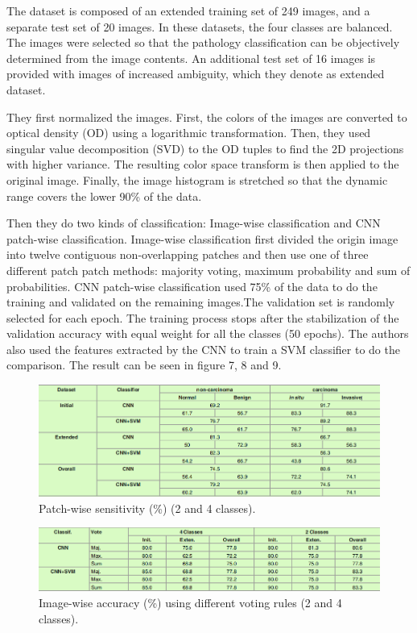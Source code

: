 \documentclass[10pt,twocolumn,letterpaper]{article}
\begin{document}
The dataset is composed of an extended training set of 249 images, and a separate test set of 20 images. In these datasets, the four classes are balanced. The images were selected so that the pathology classification can be objectively determined from the image contents. An additional
test set of 16 images is provided with images of increased ambiguity, which they denote as extended dataset.

They first normalized the images. First, the colors of the images are converted to optical density (OD) using a logarithmic transformation. Then, they used singular value decomposition (SVD)  to the OD tuples to find the 2D projections with higher variance. The resulting color space transform is then applied to the original image. Finally, the image histogram is stretched so that the dynamic range covers the lower 90\% of the data.

Then they do two kinds of classification: Image-wise classification and CNN patch-wise classification. Image-wise classification first divided the origin image into twelve contiguous non-overlapping patches and then use one of three different patch patch methods: majority voting, maximum probability and sum of probabilities. CNN patch-wise classification used 75\% of the data to do the training and validated on the remaining images.The validation set is randomly selected for each epoch. The training process stops after the stabilization of the validation accuracy with equal weight for all the classes (50 epochs). The authors also used the features extracted by the CNN to train a SVM classifier to do the comparison. The result can be seen in figure 7, 8 and 9.

\begin{figure}[t]
	\begin{center}
		\includegraphics[width=0.8\linewidth]{Pic/13.png}
	\end{center}
	\caption{Patch-wise sensitivity (\%) (2 and 4 classes).}
	\label{fig:long}
	\label{fig:onecol}
\end{figure}

\begin{figure}[t]
	\begin{center}
		\includegraphics[width=0.8\linewidth]{Pic/15.png}
	\end{center}
	\caption{Image-wise accuracy (\%) using different voting rules (2 and 4 classes).}
	\label{fig:long}
	\label{fig:onecol}
\end{figure}
\end{document}

